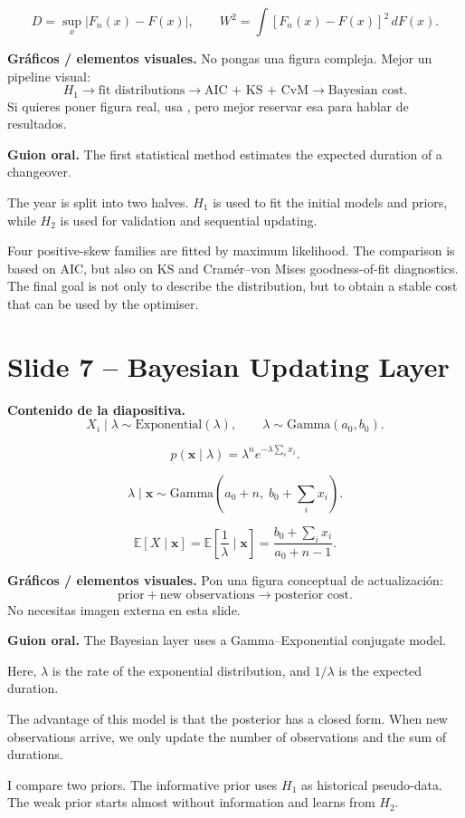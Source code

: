 \documentclass[11pt,a4paper]{article}
\newcommand{\slide}[1]{\newpage\section*{#1}}
\newcommand{\figpath}[1]{\texttt{\detokenize{report/figures/#1}}}
\newcommand{\say}{\textbf{Guion oral.} }
\newcommand{\content}{\textbf{Contenido de la diapositiva.} }
\newcommand{\figs}{\textbf{Gráficos / elementos visuales.} }
\begin{document}
\[
D=\sup_x |F_n(x)-F(x)|,
\qquad
W^2=\int [F_n(x)-F(x)]^2\,dF(x).
\]

\figs
No pongas una figura compleja. Mejor un pipeline visual:
\[
H_1
\rightarrow
\text{fit distributions}
\rightarrow
\text{AIC + KS + CvM}
\rightarrow
\text{Bayesian cost}.
\]
Si quieres poner figura real, usa \figpath{nb07_fig02.png}, pero mejor reservar
esa para hablar de resultados.

\say
The first statistical method estimates the expected duration of a changeover.

The year is split into two halves. \(H_1\) is used to fit the initial models and
priors, while \(H_2\) is used for validation and sequential updating.

Four positive-skew families are fitted by maximum likelihood. The comparison is
based on AIC, but also on KS and Cramér--von Mises goodness-of-fit diagnostics.
The final goal is not only to describe the distribution, but to obtain a stable
cost that can be used by the optimiser.

\slide{Slide 7 -- Bayesian Updating Layer}

\content
\[
X_i \mid \lambda \sim \text{Exponential}(\lambda),
\qquad
\lambda \sim \text{Gamma}(a_0,b_0).
\]

\[
p(\mathbf{x}\mid \lambda)
=
\lambda^n e^{-\lambda\sum_i x_i}.
\]

\[
\lambda \mid \mathbf{x}
\sim
\text{Gamma}
\left(
a_0+n,\;
b_0+\sum_i x_i
\right).
\]

\[
\mathbb{E}[X\mid \mathbf{x}]
=
\mathbb{E}
\left[
\frac{1}{\lambda}
\mid
\mathbf{x}
\right]
=
\frac{b_0+\sum_i x_i}{a_0+n-1}.
\]

\figs
Pon una figura conceptual de actualizaci\'on:
\[
\text{prior}
+ \text{new observations}
\rightarrow
\text{posterior cost}.
\]
No necesitas imagen externa en esta slide.

\say
The Bayesian layer uses a Gamma--Exponential conjugate model.

Here, \(\lambda\) is the rate of the exponential distribution, and \(1/\lambda\)
is the expected duration.

The advantage of this model is that the posterior has a closed form. When new
observations arrive, we only update the number of observations and the sum of
durations.

I compare two priors. The informative prior uses \(H_1\) as historical
pseudo-data. The weak prior starts almost without information and learns from
\(H_2\).
\end{document}
